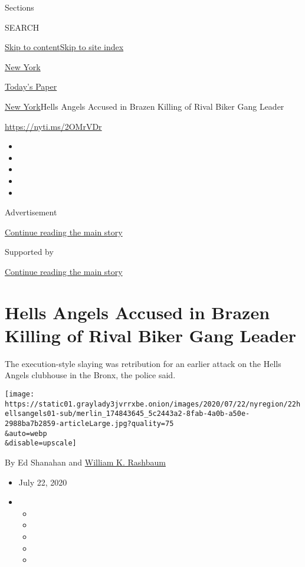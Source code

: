 Sections

SEARCH

\protect\hyperlink{site-content}{Skip to
content}\protect\hyperlink{site-index}{Skip to site index}

\href{https://www.nytimes3xbfgragh.onion/section/nyregion}{New York}

\href{https://myaccount.nytimes3xbfgragh.onion/auth/login?response_type=cookie\&client_id=vi}{}

\href{https://www.nytimes3xbfgragh.onion/section/todayspaper}{Today's
Paper}

\href{/section/nyregion}{New York}\textbar{}Hells Angels Accused in
Brazen Killing of Rival Biker Gang Leader

\url{https://nyti.ms/2OMrVDr}

\begin{itemize}
\item
\item
\item
\item
\item
\end{itemize}

Advertisement

\protect\hyperlink{after-top}{Continue reading the main story}

Supported by

\protect\hyperlink{after-sponsor}{Continue reading the main story}

\hypertarget{hells-angels-accused-in-brazen-killing-of-rival-biker-gang-leader}{%
\section{Hells Angels Accused in Brazen Killing of Rival Biker Gang
Leader}\label{hells-angels-accused-in-brazen-killing-of-rival-biker-gang-leader}}

The execution-style slaying was retribution for an earlier attack on the
Hells Angels clubhouse in the Bronx, the police said.

\texttt{[image: https://static01.graylady3jvrrxbe.onion/images/2020/07/22/nyregion/22hellsangels01-sub/merlin\_174843645\_5c2443a2-8fab-4a0b-a50e-2988ba7b2859-articleLarge.jpg?quality=75\\\&auto=webp\\\&disable=upscale]}

By Ed Shanahan and
\href{https://www.nytimes3xbfgragh.onion/by/william-k-rashbaum}{William
K. Rashbaum}

\begin{itemize}
\item
  July 22, 2020
\item
  \begin{itemize}
  \item
  \item
  \item
  \item
  \item
  \end{itemize}
\end{itemize}

